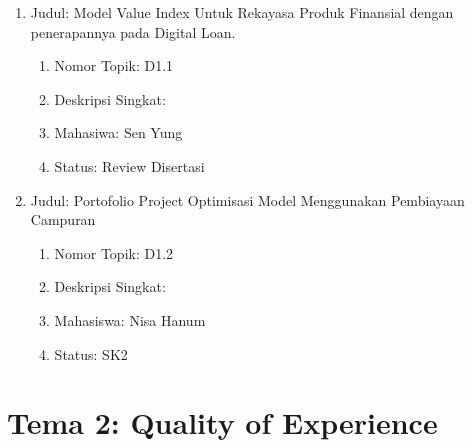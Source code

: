 \documentclass[
  letterpaper,
  DIV=11,
  numbers=noendperiod]{scrreprt}
\begin{document}
\begin{enumerate}
\def\labelenumi{\arabic{enumi}.}
\item
  Judul: Model Value Index Untuk Rekayasa Produk Finansial dengan
  penerapannya pada Digital Loan.

  \begin{enumerate}
  \def\labelenumii{\arabic{enumii}.}
  \item
    Nomor Topik: D1.1
  \item
    Deskripsi Singkat:
  \item
    Mahasiwa: Sen Yung
  \item
    Status: Review Disertasi
  \end{enumerate}
\item
  Judul: Portofolio Project Optimisasi Model Menggunakan Pembiayaan
  Campuran

  \begin{enumerate}
  \def\labelenumii{\arabic{enumii}.}
  \item
    Nomor Topik: D1.2
  \item
    Deskripsi Singkat:
  \item
    Mahasiswa: Nisa Hanum
  \item
    Status: SK2
  \end{enumerate}
\end{enumerate}

\section{Tema 2: Quality of
Experience}\label{tema-2-quality-of-experience}
\end{document}
